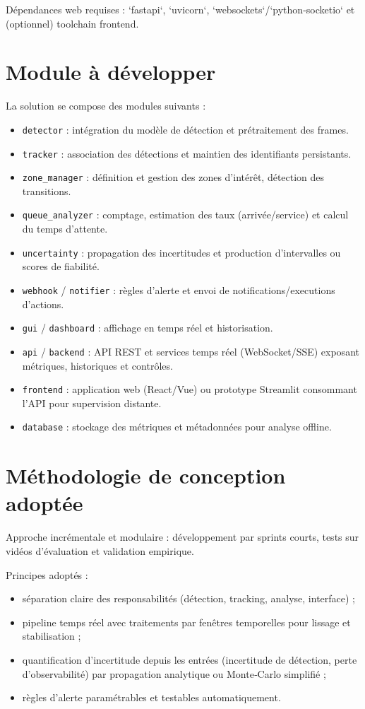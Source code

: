 \documentclass[11pt,a4paper]{article}
\begin{document}
Dépendances web requises : `fastapi`, `uvicorn`, `websockets`/`python-socketio` et (optionnel) toolchain frontend.

\section{Module à développer}
La solution se compose des modules suivants :
\begin{itemize}
  \item \texttt{detector} : intégration du modèle de détection et prétraitement des frames.
  \item \texttt{tracker} : association des détections et maintien des identifiants persistants.
  \item \texttt{zone\_manager} : définition et gestion des zones d'intérêt, détection des transitions.
  \item \texttt{queue\_analyzer} : comptage, estimation des taux (arrivée/service) et calcul du temps d'attente.
  \item \texttt{uncertainty} : propagation des incertitudes et production d'intervalles ou scores de fiabilité.
  \item \texttt{webhook} / \texttt{notifier} : règles d'alerte et envoi de notifications/executions d'actions.
  \item \texttt{gui} / \texttt{dashboard} : affichage en temps réel et historisation.
  \item \texttt{api} / \texttt{backend} : API REST et services temps réel (WebSocket/SSE) exposant métriques, historiques et contrôles.
  \item \texttt{frontend} : application web (React/Vue) ou prototype Streamlit consommant l'API pour supervision distante.
  \item \texttt{database} : stockage des métriques et métadonnées pour analyse offline.
\end{itemize}

\section{Méthodologie de conception adoptée}
Approche incrémentale et modulaire : développement par sprints courts, tests sur vidéos d'évaluation et validation empirique.

Principes adoptés :
\begin{itemize}
  \item séparation claire des responsabilités (détection, tracking, analyse, interface) ;
  \item pipeline temps réel avec traitements par fenêtres temporelles pour lissage et stabilisation ;
  \item quantification d'incertitude depuis les entrées (incertitude de détection, perte d'observabilité) par propagation analytique ou Monte‑Carlo simplifié ;
  \item règles d'alerte paramétrables et testables automatiquement.
\end{itemize}
\end{document}
